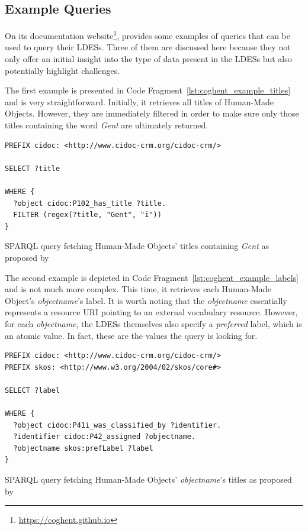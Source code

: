 \subsection{Example Queries}
\label{sec:coghent_example_queries}

On its documentation website\footnote{\url{https://coghent.github.io}}, \citet{floreverk2022queries} provides some examples of queries that can be used to query their LDESs. Three of them are discussed here because they not only offer an initial insight into the type of data present in the LDESs but also potentially highlight challenges.

The first example is presented in Code Fragment~\ref{lst:coghent_example_titles} and is very straightforward. Initially, it retrieves all titles of Human-Made Objects. However, they are immediately filtered in order to make sure only those titles containing the word \textit{Gent} are ultimately returned. \citep{floreverk2022queries}

\begin{listing}[htbp]
    \begin{verbatim}
PREFIX cidoc: <http://www.cidoc-crm.org/cidoc-crm/>

SELECT ?title

WHERE { 
  ?object cidoc:P102_has_title ?title.
  FILTER (regex(?title, "Gent", "i"))
}
    \end{verbatim}
    \caption{SPARQL query fetching Human-Made Objects' titles containing \textit{Gent} as proposed by \citet{floreverk2022queries}}
    \label{lst:coghent_example_titles}
\end{listing}

The second example is depicted in Code Fragment~\ref{lst:coghent_example_labels} and is not much more complex. This time, it retrieves each Human-Made Object's \textit{objectname}'s label. It is worth noting that the \textit{objectname} essentially represents a resource URI pointing to an external vocabulary resource. However, for each \textit{objectname}, the LDESs themselves also specify a \textit{preferred} label, which is an atomic value. In fact, these are the values the query is looking for. \citep{floreverk2022queries}

\begin{listing}[htbp]
    \begin{verbatim}
PREFIX cidoc: <http://www.cidoc-crm.org/cidoc-crm/>
PREFIX skos: <http://www.w3.org/2004/02/skos/core#>

SELECT ?label 

WHERE { 
  ?object cidoc:P41i_was_classified_by ?identifier.
  ?identifier cidoc:P42_assigned ?objectname.
  ?objectname skos:prefLabel ?label
}
    \end{verbatim}
    \caption{SPARQL query fetching Human-Made Objects' \textit{objectname}'s titles as proposed by \citet{floreverk2022queries}}
    \label{lst:coghent_example_labels}
\end{listing}

